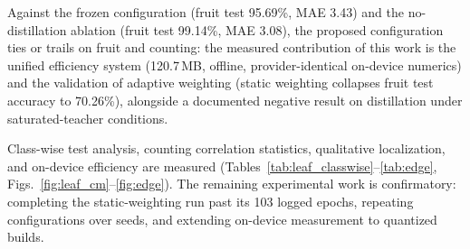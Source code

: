 \documentclass[preprint,12pt]{elsarticle}
\begin{document}
Against the frozen configuration (fruit test 95.69\%, MAE 3.43) and
the no-distillation ablation (fruit test 99.14\%, MAE 3.08), the
proposed configuration ties or trails on fruit and counting: the
measured contribution of this work is the unified efficiency system
(120.7\,MB, offline, provider-identical on-device numerics) and the
validation of adaptive weighting (static weighting collapses fruit
test accuracy to 70.26\%), alongside a documented negative result on
distillation under saturated-teacher conditions.

Class-wise test analysis, counting correlation statistics,
qualitative localization, and on-device efficiency are measured
(Tables~\ref{tab:leaf_classwise}--\ref{tab:edge},
Figs.~\ref{fig:leaf_cm}--\ref{fig:edge}). The remaining experimental
work is confirmatory: completing the static-weighting run past its
103 logged epochs, repeating configurations over seeds, and extending
on-device measurement to quantized builds.

\end{document}
